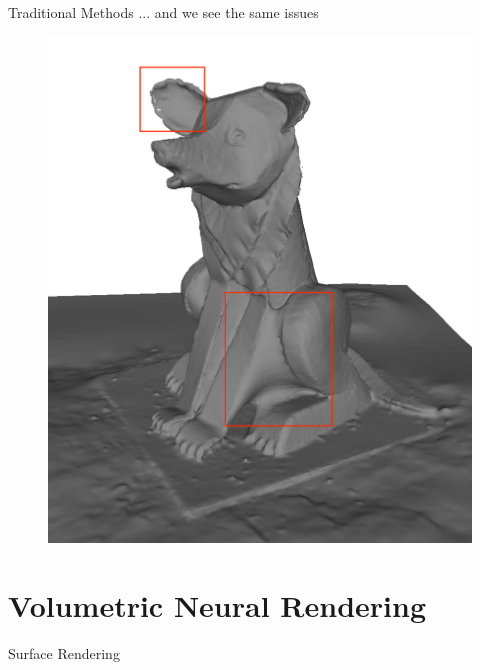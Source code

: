 \documentclass[10pt]{beamer}
\begin{document}
\begin{frame}{Traditional Methods}
    ... and we see the same issues
    \begin{figure}
        \centering
        \includegraphics[width=0.5\linewidth]{figures/intro/psr_issues.png}
    \end{figure}
\end{frame}

\section{Volumetric Neural Rendering}

 {
  \begin{frame}{Surface Rendering}
      \begin{figure}
          \centering
          \hspace{3em}
      \end{figure}
  \end{frame}
 }
\end{document}
